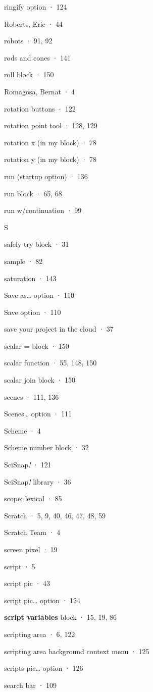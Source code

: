 \documentclass[
  letterpaper,
]{book}
\begin{document}
ringify option · 124

Roberts, Eric · 44

robots · 91, 92

rods and cones · 141

roll block · 150

Romagosa, Bernat · 4

rotation buttons · 122

rotation point tool · 128, 129

rotation x (in my block) · 78

rotation y (in my block) · 78

run (startup option) · 136

run block · 65, 68

run w/continuation · 99

S

safely try block · 31

sample · 82

saturation · 143

Save as\ldots{} option · 110

Save option · 110

save your project in the cloud · 37

scalar = block · 150

scalar function · 55, 148, 150

scalar join block · 150

scenes · 111, 136

Scenes\ldots{} option · 111

Scheme · 4

Scheme number block · 32

SciSnap\emph{!} · 121

SciSnap\emph{!} library · 36

scope: lexical · 85

Scratch · 5, 9, 40, 46, 47, 48, 59

Scratch Team · 4

screen pixel · 19

script · 5

script pic · 43

script pic\ldots{} option · 124

\textbf{script variables} block · 15, 19, 86

scripting area · 6, 122

scripting area background context menu · 125

scripts pic\ldots{} option · 126

search bar · 109
\end{document}
